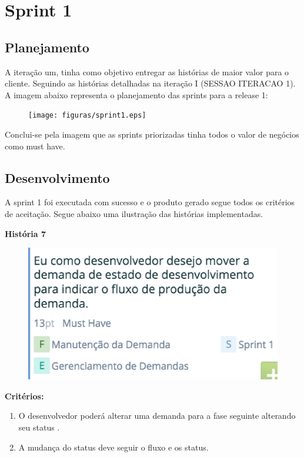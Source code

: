 \chapter[Sprint 1]{Sprint 1}

\section{Planejamento}

A iteração um, tinha como objetivo entregar as histórias de maior valor para o cliente. Seguindo as histórias detalhadas na iteração I (SESSAO ITERACAO 1). A imagem abaixo representa o planejamento das sprints para a release 1:

\begin{figure}[H]
    \centering
	\texttt{[image: figuras/sprint1.eps]}
    \caption{}
    \label{}
\end{figure}

Conclui-se pela imagem que as sprints priorizadas tinha todos o valor de negócios como must have.

\section{Desenvolvimento}

A sprint 1 foi executada com sucesso e o produto gerado segue todos os critérios de aceitação. Segue abaixo uma ilustração das histórias implementadas.

\textbf{História 7}

\begin{figure}[H]
    \centering
	\includegraphics[keepaspectratio=true,scale=0.6]{figuras/sprint2.eps}
    \caption{}
    \label{}
\end{figure}

\textbf{Critérios:} 
\begin{enumerate}
	\item O desenvolvedor poderá alterar uma demanda para a fase seguinte alterando seu status .
	\item A mudança do status deve seguir o fluxo e os status. 
\end{enumerate}

